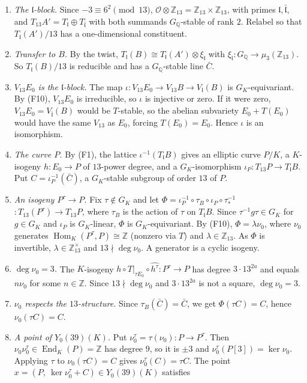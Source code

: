 \documentclass[11pt]{article}
\newcommand{\Q}{\mathbb Q}
\newcommand{\Z}{\mathbb Z}
\DeclareMathOperator{\End}{End}
\DeclareMathOperator{\Hom}{Hom}
\begin{document}
\begin{enumerate}
\item \emph{The \(\mathfrak l\)-block.} Since \(-3\equiv6^2\pmod{13}\),
          \(\mathcal O\otimes\Z_{13}=\Z_{13}\times\Z_{13}\), with primes \(\mathfrak l,\bar{\mathfrak l}\), and
          \(T_{13}A'=T_{\mathfrak l}\oplus T_{\bar{\mathfrak l}}\) with both summands \(G_{\Q}\)-stable of rank \(2\).
          Relabel so that \(T_{\mathfrak l}(A')/13\) has a one-dimensional constituent.
\item \emph{Transfer to \(B\).} By the twist, \(T_{\mathfrak l}(B)\cong T_{\mathfrak l}(A')\otimes\xi_{\mathfrak l}\)
          with \(\xi_{\mathfrak l}:G_{\Q}\to\mu_3(\Z_{13})\). So \(T_{\mathfrak l}(B)/13\) is reducible and has a
          \(G_{\Q}\)-stable line \(\bar C\).
\item \emph{\(V_{13}E_0\) is the \(\mathfrak l\)-block.} The map
          \(\iota:V_{13}E_0\to V_{13}B\to V_{\mathfrak l}(B)\) is \(G_K\)-equivariant. By (F10), \(V_{13}E_0\) is
          irreducible, so \(\iota\) is injective or zero. If it were zero, \(V_{13}E_0=V_{\bar{\mathfrak l}}(B)\)
          would be \(T\)-stable, so the abelian subvariety \(E_0+T(E_0)\) would have the same \(V_{13}\) as
          \(E_0\), forcing \(T(E_0)=E_0\). Hence \(\iota\) is an isomorphism.
\item \emph{The curve \(P\).} By (F1), the lattice \(\iota^{-1}(T_{\mathfrak l}B)\) gives an elliptic curve
          \(P/K\), a \(K\)-isogeny \(h:E_0\to P\) of \(13\)-power degree, and a \(G_K\)-isomorphism
          \(\iota_P:T_{13}P\to T_{\mathfrak l}B\). Put \(C=\iota_P^{-1}(\bar C)\), a \(G_K\)-stable subgroup of
          order \(13\) of \(P\).
\item \emph{An isogeny \(P^\tau\to P\).} Fix \(\tau\notin G_K\) and let
          \(\Phi=\iota_P^{-1}\circ\tau_B\circ\iota_P\circ\tau_*^{-1}\) \({}:T_{13}(P^\tau)\to T_{13}P\), where \(\tau_B\) is
          the action of \(\tau\) on \(T_{\mathfrak l}B\). Since \(\tau^{-1}g\tau\in G_K\) for \(g\in G_K\) and
          \(\iota_P\) is \(G_K\)-linear, \(\Phi\) is \(G_K\)-equivariant. By (F10),
          \(\Phi=\lambda\nu_0\), where \(\nu_0\) generates \(\Hom_K(P^\tau,P)\cong\Z\) (nonzero via \(T\)) and
          \(\lambda\in\Z_{13}\). As \(\Phi\) is invertible, \(\lambda\in\Z_{13}^\times\) and
          \(13\nmid\deg\nu_0\). A generator is a cyclic isogeny.
\item \emph{\(\deg\nu_0=3\).} The \(K\)-isogeny \(h\circ T|_{\tau E_0}\circ\widehat{h^\tau}:P^\tau\to P\) has
          degree \(3\cdot13^{2a}\) and equals \(n\nu_0\) for some \(n\in\Z\). Since \(13\nmid\deg\nu_0\) and
          \(3\cdot13^{2a}\) is not a square, \(\deg\nu_0=3\).
\item \emph{\(\nu_0\) respects the \(13\)-structure.} Since \(\tau_B(\bar C)=\bar C\), we get
          \(\Phi(\tau C)=C\), hence \(\nu_0(\tau C)=C\).
\item \emph{A point of \(Y_0(39)(K)\).} Put \(\nu_0^\tau=\tau(\nu_0):P\to P^\tau\). Then
          \(\nu_0\nu_0^\tau\in\End_K(P)=\Z\) has degree \(9\), so it is \(\pm3\) and
          \(\nu_0^\tau(P[3])=\ker\nu_0\). Applying \(\tau\) to \(\nu_0(\tau C)=C\) gives \(\nu_0^\tau(C)=\tau C\).
          The point \(x=(P,\ \ker\nu_0^\tau+C)\in Y_0(39)(K)\) satisfies


\end{enumerate}
\end{document}
